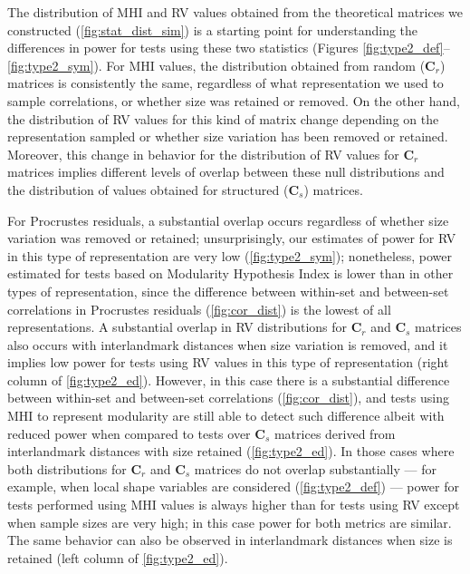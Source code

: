 \documentclass[12pt,]{article}
\begin{document}
The distribution of MHI and RV values obtained from the theoretical
matrices we constructed (\autoref{fig:stat_dist_sim}) is a starting
point for understanding the differences in power for tests using these
two statistics (Figures \ref{fig:type2_def}--\ref{fig:type2_sym}). For
MHI values, the distribution obtained from random ($\mathbf{C}_r$)
matrices is consistently the same, regardless of what representation we
used to sample correlations, or whether size was retained or removed. On
the other hand, the distribution of RV values for this kind of matrix
change depending on the representation sampled or whether size variation
has been removed or retained. Moreover, this change in behavior for the
distribution of RV values for $\mathbf{C}_r$ matrices implies different
levels of overlap between these null distributions and the distribution
of values obtained for structured ($\mathbf{C}_s$) matrices.

For Procrustes residuals, a substantial overlap occurs regardless of
whether size variation was removed or retained; unsurprisingly, our
estimates of power for RV in this type of representation are very low
(\autoref{fig:type2_sym}); nonetheless, power estimated for tests based
on Modularity Hypothesis Index is lower than in other types of
representation, since the difference between within-set and between-set
correlations in Procrustes residuals (\autoref{fig:cor_dist}) is the
lowest of all representations. A substantial overlap in RV distributions
for $\mathbf{C}_r$ and $\mathbf{C}_s$ matrices also occurs with
interlandmark distances when size variation is removed, and it implies
low power for tests using RV values in this type of representation
(right column of \autoref{fig:type2_ed}). However, in this case there is
a substantial difference between within-set and between-set correlations
(\autoref{fig:cor_dist}), and tests using MHI to represent modularity
are still able to detect such difference albeit with reduced power when
compared to tests over $\mathbf{C}_s$ matrices derived from
interlandmark distances with size retained (\autoref{fig:type2_ed}). In
those cases where both distributions for $\mathbf{C}_r$ and
$\mathbf{C}_s$ matrices do not overlap substantially --- for example,
when local shape variables are considered (\autoref{fig:type2_def}) ---
power for tests performed using MHI values is always higher than for
tests using RV except when sample sizes are very high; in this case
power for both metrics are similar. The same behavior can also be
observed in interlandmark distances when size is retained (left column
of \autoref{fig:type2_ed}).
\end{document}
